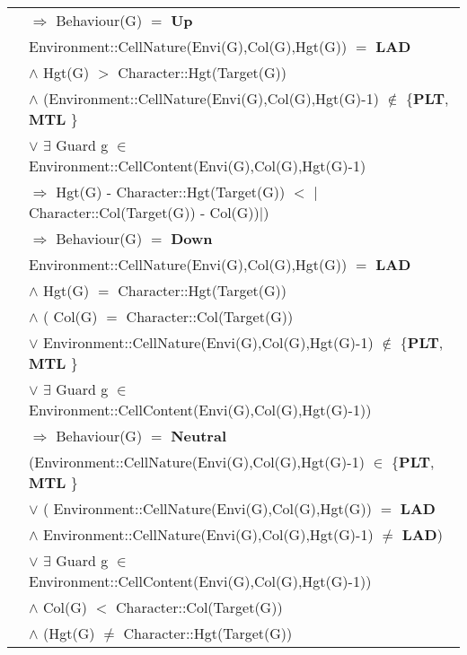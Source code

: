 \documentclass[8pt]{article}
\begin{document}
{\begin{longtable}{rl}
  & \quad\quad $\Rightarrow$ \textrm{Behaviour(G)} $=$ \textbf{Up} \\
  & \textrm{Environment::CellNature(Envi(G),Col(G),Hgt(G))} $=$ \textbf{LAD} \\
  & \quad\quad $\land$ \textrm{Hgt(G)} $>$ \textrm{Character::Hgt(Target(G))} \\
  & \quad\quad $\land$ (\textrm{Environment::CellNature(Envi(G),Col(G),Hgt(G)-1)} $\notin$ \{\textbf{PLT}, \textbf{MTL}  \} \\
  & \quad\quad\quad\quad $\lor$ $\exists$ \textrm{Guard} g $\in$ \textrm{Environment::CellContent(Envi(G),Col(G),Hgt(G)-1)} \\
  & \quad\quad\quad\quad $\Rightarrow$ \textrm{Hgt(G) - Character::Hgt(Target(G))} $<$ $|$\textrm{Character::Col(Target(G)) - Col(G)})$|$)\\
  & \quad\quad $\Rightarrow$ \textrm{Behaviour(G)} $=$ \textbf{Down} \\
  & \textrm{Environment::CellNature(Envi(G),Col(G),Hgt(G))} $=$ \textbf{LAD} \\
  & \quad\quad $\land$ \textrm{Hgt(G)} $=$ \textrm{Character::Hgt(Target(G))} \\
  & \quad\quad $\land$ ( \textrm{Col(G)} $=$ \textrm{Character::Col(Target(G))}\\
  & \quad\quad\quad\quad $\lor$ \textrm{Environment::CellNature(Envi(G),Col(G),Hgt(G)-1)} $\notin$ \{\textbf{PLT}, \textbf{MTL}  \} \\
  & \quad\quad\quad\quad $\lor$ $\exists$ \textrm{Guard} g $\in$ \textrm{Environment::CellContent(Envi(G),Col(G),Hgt(G)-1)}) \\
  & \quad\quad $\Rightarrow$ \textrm{Behaviour(G)} $=$ \textbf{Neutral} \\
  & (\textrm{Environment::CellNature(Envi(G),Col(G),Hgt(G)-1)} $\in$ \{\textbf{PLT}, \textbf{MTL}  \} \\
  & \quad\quad\quad\quad $\lor$ ( \textrm{Environment::CellNature(Envi(G),Col(G),Hgt(G))} $=$ \textbf{LAD} \\
  & \quad\quad\quad\quad\quad\quad $\land$ \textrm{Environment::CellNature(Envi(G),Col(G),Hgt(G)-1)} $\neq$ \textbf{LAD}) \\
  & \quad\quad\quad\quad $\lor$ $\exists$ \textrm{Guard} g $\in$ \textrm{Environment::CellContent(Envi(G),Col(G),Hgt(G)-1)}) \\
  & \quad\quad $\land$ \textrm{Col(G)} $<$ \textrm{Character::Col(Target(G))} \\
  & \quad\quad $\land$ (\textrm{Hgt(G)} $\neq$ \textrm{Character::Hgt(Target(G))} \\

\end{longtable}}
\end{document}
